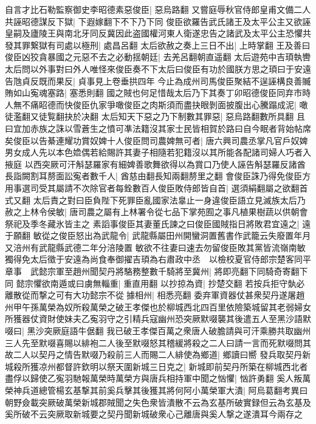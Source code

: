 自言才比石勒監察御史李昭德素惡俊臣|{
	惡烏路翻}
又嘗庭辱秋官侍郎皇甫文備二人共誣昭德謀反下獄|{
	下遐嫁翻下不下乃下同}
俊臣欲羅告武氏諸王及太平公主又欲誣皇嗣及廬陵王與南北牙同反冀因此盗國權河東人衛遂忠告之諸武及太平公主恐懼共發其罪繋獄有司處以極刑|{
	處昌呂翻}
太后欲赦之奏上三日不出|{
	上時掌翻}
王及善曰俊臣凶狡貪暴國之元惡不去之必動揺朝廷|{
	去羌呂翻朝直遥翻}
太后遊苑中吉頊執轡太后問以外事對曰外人唯怪來俊臣奏不下太后曰俊臣有功於國朕方思之頊曰于安遠告虺貞反既而果反|{
	貞事見上卷垂拱四年}
今止為成州司馬俊臣聚結不逞誣構良善贓賄如山寃魂塞路|{
	塞悉則翻}
國之賊也何足惜哉太后乃下其奏丁卯昭德俊臣同弃市時人無不痛眧德而快俊臣仇家爭噉俊臣之肉斯須而盡抉眼剝面披腹出心騰蹋成泥|{
	噉徒濫翻又徒覧翻抉於决翻}
太后知天下惡之乃下制數其罪惡|{
	惡烏路翻數所具翻}
且曰宜加赤族之誅以雪蒼生之憤可凖法籍沒其家士民皆相賀於路曰自今眠者背始帖席矣俊臣以告綦連耀功賞奴婢十人俊臣問司農婢無可者|{
	唐六興司農丞掌凡官戶奴婢男女成人先以本色嫓偶若給賜許其妻子相隨若犯籍沒以其所能各配諸司婦人巧者入掖庭}
以西突厥可汗斛瑟羅家有細婢善歌舞欲得以為賞口乃使人誣告斛瑟羅反諸酋長詣闕割耳剺面訟寃者數千人|{
	酋慈由翻長知兩翻剺里之翻}
會俊臣誅乃得免俊臣方用事選司受其屬請不次除官者每銓數百人俊臣敗侍郎皆自首|{
	選須絹翻屬之欲翻首式又翻}
太后責之對曰臣負陛下死罪臣亂國家法辠止一身違俊臣語立見滅族太后乃赦之上林令侯敏|{
	唐司農之屬有上林署令從七品下掌苑囿之事凡植果樹蔬以供朝會祭祀及季冬藏氷皆主之}
素謟事俊臣其妻董氏諫之曰俊臣國賊指日將敗君宜遠之|{
	遠于願翻}
敏從之俊臣怒出為武龍令|{
	武龍縣屬田州開蠻洞置舊書作武籠云失廢置年月又涪州有武龍縣武德二年分涪陵置}
敏欲不往妻曰速去勿留俊臣敗其黨皆流嶺南敏獨得免太后徵于安遠為尚食奉御擢吉頊為右肅政中丞　以檢校夏官侍郎宗楚客同平章事　武懿宗軍至趙州聞契丹將駱務整數千騎將至冀州|{
	將即亮翻下同騎奇寄翻下同}
懿宗懼欲南遁或曰虜無輜重|{
	重直用翻}
以抄掠為資|{
	抄楚交翻}
若按兵拒守埶必離散從而撃之可有大功懿宗不從據相州|{
	相悉亮翻}
委弃軍資器仗甚衆契丹遂屠趙州甲午孫萬榮為奴所殺萬榮之破王孝傑也於柳城西北四百里依險築城留其老弱婦女所獲器仗資財使妹夫乙寃羽守之引精兵寇幽州恐突厥默啜襲其後遣五人至黑沙語默啜曰|{
	黑沙突厥庭語牛倨翻}
我已破王孝傑百萬之衆唐人破膽請與可汗乘勝共取幽州三人先至默啜喜賜以緋袍二人後至默啜怒其稽緩將殺之二人曰請一言而死默啜問其故二人以契丹之情告默啜乃殺前三人而賜二人緋使為鄉道|{
	鄉讀曰嚮}
發兵取契丹新城殺所獲凉州都督許欽明以祭天圍新城三日克之|{
	新城即前契丹所築在柳城西北者}
盡俘以歸使乙寃羽馳報萬榮時萬榮方與唐兵相持軍中聞之忷懼|{
	忷許勇翻}
奚人叛萬榮神兵道總管楊玄基撃其前奚兵擊其後獲其將何阿小萬榮軍大潰|{
	阿烏葛翻考異曰朝野僉載突厥破萬榮新城郡賊聞之失色衆皆潰散不云為玄基所破實録但云為玄基及奚所破不云突厥取新城要之契丹聞新城破衆心己離唐與奚人撃之遂潰耳今兩存之}
